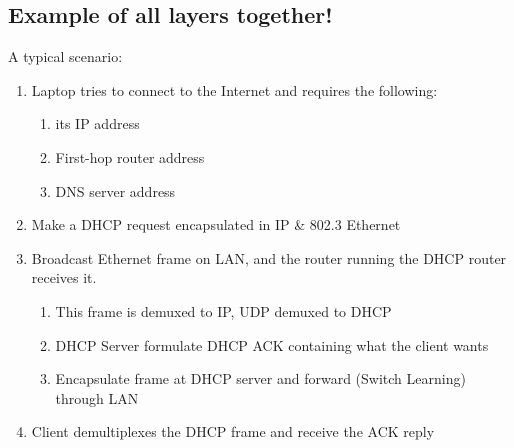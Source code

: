 \documentclass[a4paper]{article}
\begin{document}
\subsection{Example of all layers together!}
A typical scenario:
\begin{enumerate}
    \item Laptop tries to connect to the Internet and requires the following:
    \begin{enumerate}[label=\roman*.]
        \item its IP address
        \item First-hop router address
        \item DNS server address
    \end{enumerate}
    \item Make a DHCP request encapsulated in IP \& 802.3 Ethernet
    \item Broadcast Ethernet frame on LAN, and the router running the DHCP router receives it.
    \begin{enumerate}[label=\roman*.]
        \item This frame is demuxed to IP, UDP demuxed to DHCP
        \item DHCP Server formulate DHCP ACK containing what the client wants
        \item Encapsulate frame at DHCP server and forward (Switch Learning) through LAN
    \end{enumerate}
    \item Client demultiplexes the DHCP frame and receive the ACK reply
\end{enumerate}

\newpage
\end{document}
